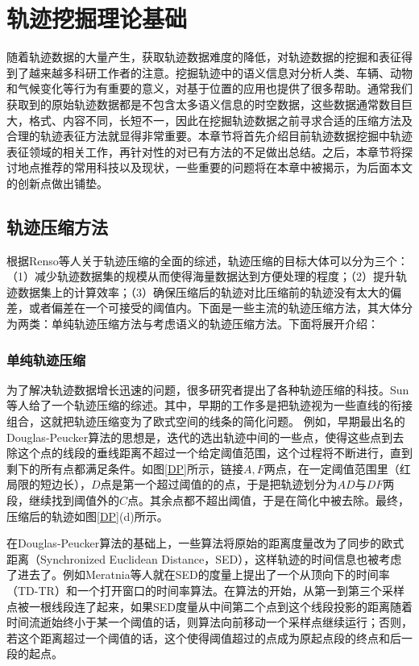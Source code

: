 
\chapter{轨迹挖掘理论基础}
\label{chapter:rw}

随着轨迹数据的大量产生，获取轨迹数据难度的降低，对轨迹数据的挖掘和表征得到了越来越多科研工作者的注意。挖掘轨迹中的语义信息对分析人类、车辆、动物和气候变化等行为有重要的意义，对基于位置的应用也提供了很多帮助。通常我们获取到的原始轨迹数据都是不包含太多语义信息的时空数据，这些数据通常数目巨大，格式、内容不同，长短不一，因此在挖掘轨迹数据之前寻求合适的压缩方法及合理的轨迹表征方法就显得非常重要。本章节将首先介绍目前轨迹数据挖掘中轨迹表征领域的相关工作，再针对性的对已有方法的不足做出总结。之后，本章节将探讨地点推荐的常用科技以及现状，一些重要的问题将在本章中被揭示，为后面本文的创新点做出铺垫。



\section{轨迹压缩方法}
根据Renso等人关于轨迹压缩的全面的综述，轨迹压缩的目标大体可以分为三个：（1）减少轨迹数据集的规模从而使得海量数据达到方便处理的程度；（2）提升轨迹数据集上的计算效率；（3）确保压缩后的轨迹对比压缩前的轨迹没有太大的偏差，或者偏差在一个可接受的阈值内。下面是一些主流的轨迹压缩方法，其大体分为两类：单纯轨迹压缩方法与考虑语义的轨迹压缩方法。下面将展开介绍：

\subsection{单纯轨迹压缩}
为了解决轨迹数据增长迅速的问题，很多研究者提出了各种轨迹压缩的科技。Sun等人给了一个轨迹压缩的综述。其中，早期的工作多是把轨迹视为一些直线的衔接组合，这就把轨迹压缩变为了欧式空间的线条的简化问题。 例如，早期最出名的Douglas-Peucker算法的思想是，迭代的选出轨迹中间的一些点，使得这些点到去除这个点的线段的垂线距离不超过一个给定阈值范围，这个过程将不断进行，直到剩下的所有点都满足条件。如图\ref{DP}所示，链接$A,F$两点，在一定阈值范围里（红局限的短边长），$D$点是第一个超过阈值的的点，于是把轨迹划分为$AD$与$DF$两段，继续找到阈值外的$C$点。其余点都不超出阈值，于是在简化中被去除。最终，压缩后的轨迹如图\ref{DP}(d)所示。


在Douglas-Peucker算法的基础上，一些算法将原始的距离度量改为了同步的欧式距离（Synchronized Euclidean Distance，SED），这样轨迹的时间信息也被考虑了进去了。例如Meratnia等人就在SED的度量上提出了一个从顶向下的时间率（TD-TR）和一个打开窗口的时间率算法。在算法的开始，从第一到第三个采样点被一根线段连了起来，如果SED度量从中间第二个点到这个线段投影的距离随着时间流逝始终小于某一个阈值的话，则算法向前移动一个采样点继续运行；否则，若这个距离超过一个阈值的话，这个使得阈值超过的点成为原起点段的终点和后一段的起点。

